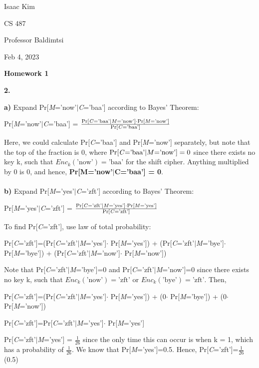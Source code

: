 \documentclass[12pt]{article}
\begin{document}
\noindent Isaac Kim

\noindent CS 487

\noindent Professor Baldimtsi

\noindent Feb 4, 2023

\begin{center} 
\textbf{Homework 1}
\end{center}

\noindent \textbf{2.} 

\noindent \textbf{a)} Expand Pr[\emph{M}='now'$|$\emph{C}='baa'] according to Bayes' Theorem:

\begin{center}
Pr[\emph{M}='now'$|$\emph{C}='baa'] = $\frac{\text{Pr[\emph{C}='baa'}|\text{\emph{M}='now']} \cdot \text{Pr[\emph{M}='now']}}{\text{Pr[\emph{C}='baa']}}$
\end{center}

\noindent Here, we could calculate Pr[\emph{C}='baa'] and Pr[\emph{M}='now'] separately, but note that the top of the fraction is 0, where $\text{Pr[\emph{C}='baa'}|M\text{='now']} = 0$ since there exists no key k, such that $Enc_k(\text{'now'}) = \text{'baa'}$ for the shift cipher. Anything multiplied by 0 is 0, and hence, \textbf{Pr[M='now'}$|$\textbf{C='baa'] = 0}.
\\
\\
\noindent \textbf{b)} Expand Pr[\emph{M}='yes'$|$\emph{C}='zft'] according to Bayes' Theorem:

\begin{center}
Pr[\emph{M}='yes'$|$\emph{C}='zft'] = $\frac{\text{Pr[\emph{C}='zft'}|\text{\emph{M}='yes']} \cdot \text{Pr[\emph{M}='yes']}}{\text{Pr[\emph{C}='zft']}}$
\end{center}

\noindent To find Pr[\emph{C}='zft'], use law of total probability:
\begin{center}
Pr[\emph{C}='zft']=(Pr[\emph{C}='zft'$|$\emph{M}='yes']$\cdot$ Pr[\emph{M}='yes']) + (Pr[\emph{C}='zft'$|$\emph{M}='bye']$\cdot$ Pr[\emph{M}='bye']) + (Pr[\emph{C}='zft'$|$\emph{M}='now']$\cdot$ Pr[\emph{M}='now'])
\end{center}

\noindent Note that Pr[\emph{C}='zft'$|$\emph{M}='bye']=0 and Pr[\emph{C}='zft'$|$\emph{M}='now']=0 since there exists no key k, such that $Enc_k(\text{'now'}) = \text{'zft'}$ or $Enc_k(\text{'bye'}) = \text{'zft'}$. Then, 
\begin{center}
Pr[\emph{C}='zft']=(Pr[\emph{C}='zft'$|$\emph{M}='yes']$\cdot$ Pr[\emph{M}='yes']) + (0$\cdot$ Pr[\emph{M}='bye']) + (0$\cdot$ Pr[\emph{M}='now'])

Pr[\emph{C}='zft']=Pr[\emph{C}='zft'$|$\emph{M}='yes']$\cdot$ Pr[\emph{M}='yes']
\end{center}
\noindent Pr[\emph{C}='zft'$|$\emph{M}='yes'] = $\frac{1}{26}$ since the only time this can occur is when k = 1, which has a probability of $\frac{1}{26}$. We know that Pr[\emph{M}='yes']=0.5.
Hence, Pr[\emph{C}='zft']=$\frac{1}{26}$(0.5)
\end{document}
